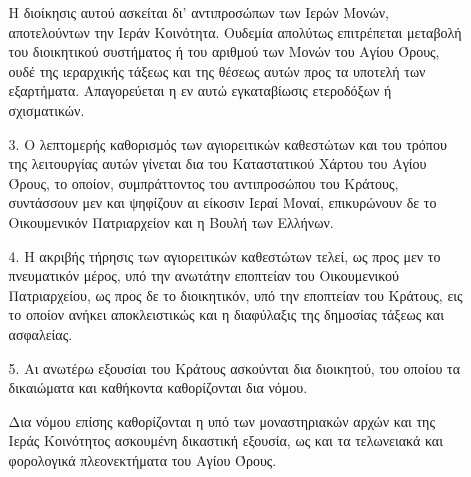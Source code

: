 \documentclass[twoside, a4paper, 10pt]{article}
\begin{document}
\begin{multicols}{2}
\begin{enumerate}
\begin{BigQuote}
\begin{enumerate}
	Η διοίκησις αυτού ασκείται δι' αντιπροσώπων των Ιερών Μονών, αποτελούντων την Ιεράν Κοινότητα. Ουδεμία απολύτως επιτρέπεται μεταβολή του διοικητικού συστήματος ή του αριθμού των Μονών του Αγίου Όρους, ουδέ της ιεραρχικής τάξεως και της θέσεως αυτών προς τα υποτελή των εξαρτήματα. Απαγορεύεται η εν αυτώ  εγκαταβίωσις ετεροδόξων ή σχισματικών.
  \item[3.] Ο λεπτομερής καθορισμός των αγιορειτικών καθεστώτων και του τρόπου της λειτουργίας αυτών γίνεται δια του Καταστατικού Χάρτου του Αγίου Όρους, το οποίον, συμπράττοντος του αντιπροσώπου του Κράτους, συντάσσουν μεν και ψηφίζουν αι είκοσιν Ιεραί Μοναί, επικυρώνουν δε το Οικουμενικόν Πατριαρχείον και η Βουλή των Ελλήνων.
  \item[4.] Η ακριβής τήρησις των αγιορειτικών καθεστώτων τελεί, ως προς μεν το πνευματικόν μέρος, υπό την ανωτάτην εποπτείαν του Οικουμενικού Πατριαρχείου, ως προς δε το διοικητικόν, υπό την εποπτείαν του Κράτους, εις το οποίον ανήκει αποκλειστικώς και η διαφύλαξις της δημοσίας τάξεως και ασφαλείας.
  \item[5.] Αι ανωτέρω εξουσίαι του Κράτους ασκούνται δια διοικητού, του οποίου τα δικαιώματα και καθήκοντα καθορίζονται δια νόμου.

	Δια νόμου επίσης καθορίζονται η υπό των μοναστηριακών αρχών και της Ιεράς Κοινότητος ασκουμένη δικαστική εξουσία, ως και τα τελωνειακά και φορολογικά πλεονεκτήματα του Αγίου Όρους.
\end{enumerate}


\end{BigQuote}
\end{enumerate}
\end{multicols}
\end{document}
